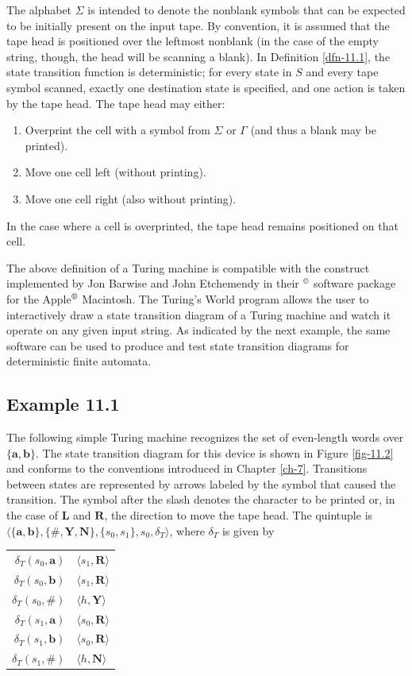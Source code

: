The alphabet $\Sigma$ is intended to denote the nonblank symbols that can be
expected to be initially present on the input tape. By convention, it is assumed
that the tape head is positioned over the leftmost nonblank (in the case of the
empty string, though, the head will be scanning a blank). In Definition \ref{dfn-11.1},
the state transition function is deterministic; for every state in $S$ and every
tape symbol scanned, exactly one destination state is specified, and one action
is taken by the tape head. The tape head may either:
\begin{enumerate}
\item Overprint the cell with a symbol from $\Sigma$ or $\Gamma$ (and thus a
blank may be printed).
\item Move one cell left (without printing).
\item Move one cell right (also without printing).
\end{enumerate}
In the case where a cell is overprinted, the tape head remains positioned on
that cell.

The above definition of a Turing machine is compatible with the construct
implemented by Jon Barwise and John Etchemendy in their
$^{\copyright}$ software package for the Apple$^{\text{\textregistered}}$
Macintosh. The Turing's World program allows the user to interactively draw a
state transition diagram of a Turing machine and watch it operate on any given
input string. As indicated by the next example, the same software can be used
to produce and test state transition diagrams for deterministic finite automata.

\subsection*{Example 11.1}

The following simple Turing machine recognizes the set of even-length words
over $\{\pmb{a},\pmb{b}\}$. The state transition diagram for this device is
shown in Figure \ref{fig-11.2} and conforms to the conventions introduced in Chapter \ref{ch-7}.
Transitions between states are represented by arrows labeled by the symbol that
caused the transition. The symbol after the slash denotes the character to be
printed or, in the case of $\pmb{L}$ and $\pmb{R}$, the direction to move the
tape head. The quintuple is $\langle\{\pmb{a},\pmb{b}\},\{\pmb{\#},\pmb{Y},
\pmb{N}\},\{s_0,s_1\},s_0,\delta_T\rangle$, where $\delta_T$ is given by
\begin{center}\begin{tabular}{r@{ = }l}
$\delta_T(s_0,\pmb{a})$ & $\langle s_1,\pmb{R}\rangle$ \\
$\delta_T(s_0,\pmb{b})$ & $\langle s_1,\pmb{R}\rangle$ \\
$\delta_T(s_0,\pmb{\#})$ & $\langle h,\pmb{Y}\rangle$ \\
$\delta_T(s_1,\pmb{a})$ & $\langle s_0,\pmb{R}\rangle$ \\
$\delta_T(s_1,\pmb{b})$ & $\langle s_0,\pmb{R}\rangle$ \\
$\delta_T(s_1,\pmb{\#})$ & $\langle h,\pmb{N}\rangle$
\end{tabular}\end{center}

